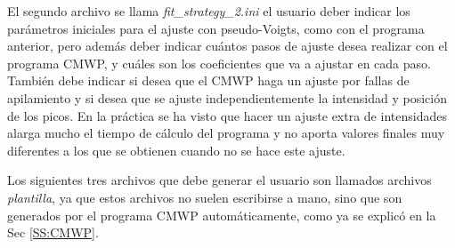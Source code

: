 El segundo archivo se llama \textit{fit\_strategy\_2.ini} el usuario deber indicar los parámetros iniciales para el ajuste con pseudo-Voigts, como con el programa anterior, pero además deber indicar cuántos pasos de ajuste desea realizar con el programa CMWP, y cuáles son los coeficientes que va a ajustar en cada paso.
También debe indicar si desea que el CMWP haga un ajuste por fallas de apilamiento  y si desea que se ajuste independientemente la intensidad y posición de los picos.
En la práctica se ha visto que hacer un ajuste extra de intensidades alarga mucho el tiempo de cálculo del programa y no aporta valores finales muy diferentes a los que se obtienen cuando no se hace este ajuste.

Los siguientes tres archivos que debe generar el usuario son llamados archivos \textit{plantilla}, ya que estos archivos no suelen escribirse a mano, sino que son generados por el programa CMWP automáticamente, como ya se explicó en la Sec \ref{SS:CMWP}.


\iffalse
\subsection{Langford}\label{SS:MLgfrd}

\begin{figure}[!htb]
  \centering
  \texttt{[image: GaussianStrain]}
  \caption{Coeficientes de strain gaussiano y lorentziano.}
  \label{fig:GaussStrainn}
\end{figure}

\begin{figure}[!htb]
  \centering
  \texttt{[image: RealStrain]}
  \caption{Coeficientes de strain posta.}
  \label{fig:RealStrain}
\end{figure}

\begin{figure}[!htb]
  \centering
  \texttt{[image: Strain\_Compare]}
  \caption{Comparacion del gaussiano con el posta.}
  \label{fig:RealvsGauss}
\end{figure}

\newpage
\fi
